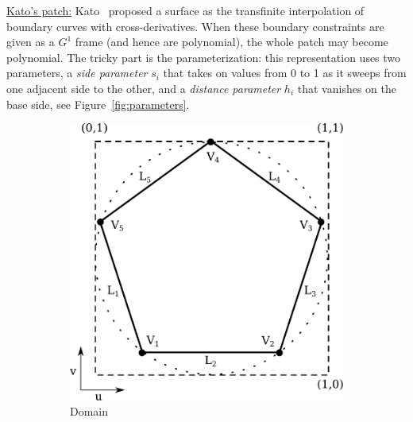 \documentclass{article}
\begin{document}
\vspace{10pt}
\noindent\underline{Kato's patch:}\vspace{0.2em}\newline
Kato~\cite{kato} proposed a surface as the transfinite interpolation of boundary curves with
cross-derivatives. When these boundary constraints are given as a $G^1$ frame (and hence
are polynomial), the whole patch may become polynomial. The tricky part is the parameterization:
this representation uses two parameters, a \emph{side parameter} $s_i$
that takes on values from 0 to 1 as it sweeps from one adjacent side to the other,
and a \emph{distance parameter} $h_i$ that vanishes on the base side, see
Figure~\ref{fig:parameters}.
\begin{figure}[b!]
  \begin{subfigure}{0.30\textwidth}
    \includegraphics[width = \textwidth]{images/domain.pdf}
    \caption{Domain}
    \label{fig:domain}
  \end{subfigure}
  \hfill
  \begin{subfigure}{0.30\textwidth}
    \begin{minipage}[b][5cm][b]{\textwidth}
      \centering

\end{minipage}
\end{subfigure}
\end{figure}
\end{document}
